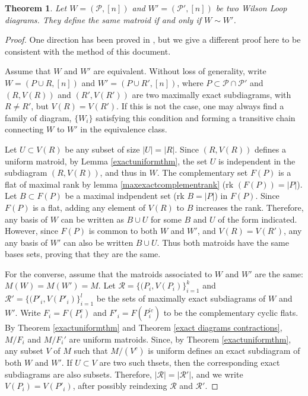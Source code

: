 \documentclass[11pt]{article}
\newcommand{\rk}{\textrm{rk }}
\newcommand{\cP}{\mathcal{P}}
\newtheorem{thm}{Theorem}[section]
\theoremstyle{remark}
\theoremstyle{definition}
\begin{document}
\begin{thm}\label{same matroid iff equiv}
Let $W= (\cP, [n])$ and $W'= (\cP', [n])$ be two Wilson Loop diagrams. They define the same matroid if and only if $W \sim W'$.
\end{thm}

\begin{proof}
One direction has been proved in \cite[Theorem 1.18]{wilsonloop}, but we give a different proof here to be consistent with the method of this document.

Assume that $W$ and $W'$ are equivalent. Without loss of generality, write $W = (P \cup R, [n])$ and $W' = (P \cup R', [n])$, where $P \subset \cP \cap \cP'$ and $(R, V(R))$ and $(R', V(R'))$ are two maximally exact subdiagrams, with $R \neq R'$, but $V(R) = V(R')$. If this is not the case, one may always find a family of diagram, $\{W_i\}$ satisfying this condition and forming a transitive chain connecting $W$ to $W'$ in the equivalence class.

Let $U \subset V(R)$ be any subset of size $|U| = |R|$. Since $(R, V(R))$ defines a uniform matroid, by Lemma \ref{exactuniformthm}, the set $U$ is independent in the subdiagram $(R, V(R))$, and thus in $W$. The complementary set $F(P)$ is a flat of maximal rank by lemma \ref{maxexactcomplementrank} ($\rk(F(P)) = |P|$). Let $B \subset F(P)$ be a maximal indpendent set ($\rk B = |P|$) in $F(P)$. Since $F(P)$ is a flat, adding any element of $V(R)$ to $B$ increases the rank. Therefore, any basis of $W$ can be written as $B \cup U$ for some $B$ and $U$ of the form indicated. However, since $F(P)$ is common to both $W$ and $W'$, and $V(R) = V(R')$, any any basis of $W'$ can also be written $B \cup U$. Thus both matroids have the same bases sets, proving that they are the same.

For the converse, assume that the matroids associated to $W$ and $W'$ are the same: $M(W) = M(W')= M$. Let $\mathcal{R} = \{(P_i, V(P_i)\}_{i=1}^k$ and $\mathcal{R}' = \{(P'_i, V(P'_i)\}_{i=1}^l$ be the sets of maximally exact subdiagrams of $W$ and $W'$. Write $F_i = F(P_i^c)$ and $F'_i = F(P^{'c}_i)$ to be the complementary cyclic flats. By Theorem \ref{exactuniformthm} and Theorem \ref{exact diagrams contractions},  $M/F_i$ and $M/F_i'$ are uniform matroids. Since, by Theorem \ref{exactuniformthm}, any subset $V$ of $M$ such that $M/(V^c)$ is uniform defines an exact subdiagram of both $W$ and $W'$. If $U \subset V$ are two such thsets, then the corresponding exact subdiagrams are also subsets. Therefore, $|\mathcal{R}| = |\mathcal{R}'|$, and we write $V(P_i) = V(P'_i)$, after possibly reindexing $\mathcal{R}$ and $\mathcal{R}'$.


\end{proof}
\end{document}
